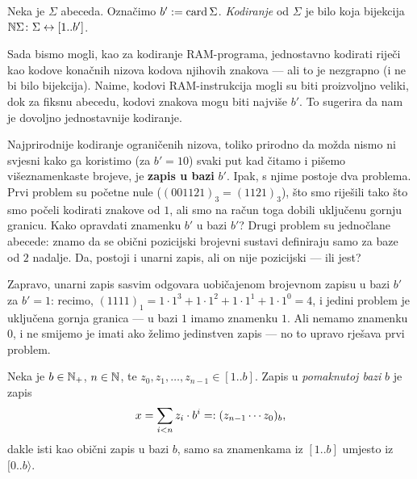 \begin{definicija}[{name=[kodiranje abecede]}]
Neka je $\Sigma$ abeceda. Označimo $b':=\operatorname{card}\Sigma$. %
\emph{Kodiranje} od $\Sigma$ je bilo koja bijekcija ${\mathbb N}\Sigma\colon\Sigma\leftrightarrow[1..b']$.
\end{definicija}


Sada bismo mogli, kao za kodiranje RAM-programa, jednostavno kodirati riječi kao kodove konačnih nizova kodova njihovih znakova --- ali to je nezgrapno (i ne bi bilo bijekcija). Naime, kodovi RAM-instrukcija mogli su biti proizvoljno veliki, dok za fiksnu abecedu, kodovi znakova mogu biti najviše $b'$. To sugerira da nam je dovoljno jednostavnije kodiranje.

Najprirodnije kodiranje ograničenih nizova, toliko prirodno da možda nismo ni svjesni kako ga koristimo (za $b'=10$) svaki put kad čitamo i pišemo višeznamenkaste brojeve, je \textbf{zapis u bazi} $b'$. Ipak, s njime postoje dva problema. Prvi problem su početne nule ($(001121)_3=(1121)_3$), što smo riješili tako što smo počeli kodirati znakove od $1$, ali smo na račun toga dobili uključenu gornju granicu. Kako opravdati znamenku $b'$ u bazi $b'$? Drugi problem su jednočlane abecede: znamo da se obični pozicijski brojevni sustavi definiraju samo za baze od $2$ nadalje. Da, postoji i unarni zapis, ali on nije pozicijski --- ili jest?

Zapravo, unarni zapis sasvim odgovara uobičajenom brojevnom zapisu u bazi $b'$ za $b'=1$: recimo, $(1111)_1=1\cdot1^3+1\cdot1^2+1\cdot1^1+1\cdot1^0=4$, i jedini problem je uključena gornja granica --- u bazi $1$ imamo znamenku $1$. Ali nemamo znamenku $0$, i ne smijemo je imati ako želimo jedinstven zapis --- no to upravo rješava prvi problem.

\begin{definicija}[{name=[zapis broja u pomaknutoj bazi]}]
Neka je $b\in{\mathbb N}_+$, $n\in{\mathbb N}$, te $z_0,z_1,\dotsc,z_{n-1}\in[1..b]$. Zapis u \emph{pomaknutoj bazi} $b$ je zapis
\begin{equation}\label{eq:pomakbaza}
    x=\sum_{i<n}z_i\cdot b^i=:(z_{n-1}\dotsm z_0)_b\text,
\end{equation}
dakle isti kao obični zapis u bazi $b$, samo sa znamenkama iz $[1..b]$ umjesto iz $[0..b\rangle$.
\end{definicija}


